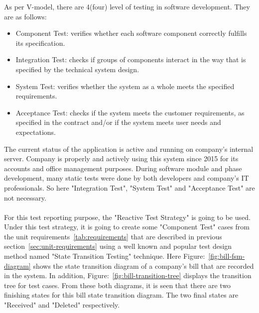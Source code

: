 \documentclass[12pt]{article}
\begin{document}
As per V-model, there are 4(four) level of testing in software development\cite{Spillner:Linz:Schaefer:2014}. They are as follows: 

\begin{itemize}
	
    \item Component Test: verifies whether each software component correctly fulfills its specification\cite{Spillner:Linz:Schaefer:2014}. 
    
    \item Integration Test: checks if groups of components interact in the way that is specified by the technical system design\cite{Spillner:Linz:Schaefer:2014}.
    
    \item System Test: verifies whether the system as a whole meets the specified requirements\cite{Spillner:Linz:Schaefer:2014}.
    
    \item Acceptance Test: checks if the system meets the customer requirements, as specified in the contract and/or if the system meets user needs and expectations\cite{Spillner:Linz:Schaefer:2014}. \\

\end{itemize} 

The current status of the application is active and running on company's\cite{SML:1965} internal server. Company is properly and actively using this system since 2015 for its accounts and office management purposes. During software module and phase development, many static tests were done by both developers and company's IT professionals. So here "Integration Test"\cite{Spillner:Linz:Schaefer:2014}, "System Test"\cite{Spillner:Linz:Schaefer:2014} and "Acceptance Test"\cite{Spillner:Linz:Schaefer:2014} are not necessary. \\ \\ 
For this test reporting purpose, the "Reactive Test Strategy"\cite{Spillner:Linz:Schaefer:2014} is going to be used. Under this test strategy, it is going to create some "Component Test" cases from the unit requirements~\ref{tab:requirements} that are described in previous section~\ref{sec:unit-requirements} using a well known and popular test design method named "State Transition Testing"\cite{Spillner:Linz:Schaefer:2014} technique. Here Figure:~\ref{fig:bill-fsm-diagram} shows the state transition diagram of a company's bill that are recorded in the system. In addition, Figure:~\ref{fig:bill-transition-tree} displays the transition tree for test cases. From these both diagrams, it is seen that there are two finishing states for this bill state transition diagram. The two final states are "Received" and "Deleted" respectively. 
\end{document}
